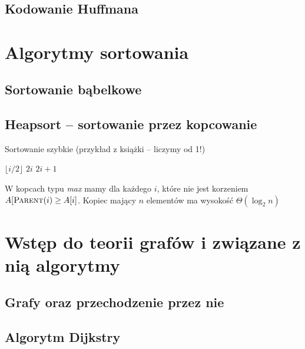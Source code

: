 \documentclass[10pt, oneside]{article}
\theoremstyle{remark}
\begin{document}
\begin{verbatim}
	
\end{verbatim}

\subsection{Kodowanie Huffmana}


\section{Algorytmy sortowania}

\subsection{Sortowanie bąbelkowe}

\subsection{Heapsort -- sortowanie przez kopcowanie}

\begin{algorithm}
    \caption{Sortowanie szybkie (przykład z książki -- liczymy od 1!)}
    \label{alg:quicksort}
    \begin{algorithmic}[1] %
            \State \Return $\lfloor i/2 \rfloor$
        \EndFunction
            	\State \Return $2i$
        \EndFunction
            	\State \Return $2i+1$
        \EndFunction
    \end{algorithmic}
\end{algorithm}

W kopcach typu \emph{max} mamy dla każdego $i$, które nie jest korzeniem $A[\Call{Parent}{i} \geq A[i]$. Kopiec mający $n$ elementów ma wysokość $\Theta (\log_2 n)$


\section{Wstęp do teorii grafów i związane z nią algorytmy}
\subsection{Grafy oraz przechodzenie przez nie}
\subsection{Algorytm Dijkstry}
\end{document}
